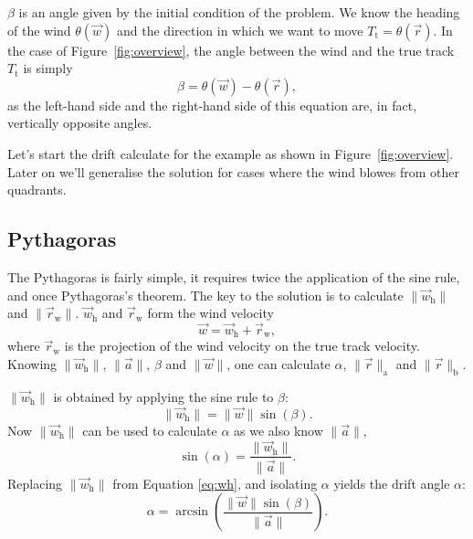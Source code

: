 \documentclass[a4paper,10pt]{article}
\begin{document}
$\beta$ is an angle given by the initial condition of the problem.
We know the heading of the wind $\theta(\vec{w})$ and the direction in which we want to move $T_\mathrm{t}=\theta(\vec{r})$.
In the case of Figure~\ref{fig:overview}, the angle between the wind and the true track $T_\mathrm{t}$ is simply
\begin{equation}
 \beta = \theta(\vec{w}) - \theta(\vec{r}),
\end{equation}
as the left-hand side and the right-hand side of this equation are, in fact, vertically opposite angles. 

Let's start the drift calculate for the example as shown in Figure~\ref{fig:overview}.
Later on we'll generalise the solution for cases where the wind blowes from other quadrants.

\subsection{Pythagoras}

The Pythagoras is fairly simple, it requires twice the application of the sine rule, and once Pythagoras's theorem.
The key to the solution is to calculate $\|\vec{w}_\mathrm{h}\|$ and $\|\vec{r}_\mathrm{w}\|$.
$\vec{w}_\mathrm{h}$ and $\vec{r}_\mathrm{w}$ form the wind velocity 
\begin{equation}
 \vec{w}= \vec{w}_\mathrm{h}+\vec{r}_\mathrm{w},
\end{equation}
where $\vec{r}_\mathrm{w}$ is the projection of the wind velocity on the true track velocity.
Knowing $\|\vec{w}_\mathrm{h}\|$, $\|\vec{a}\|$, $\beta$ and $\|\vec{w}\|$, one can calculate $\alpha$, $\|\vec{r}\|_\mathrm{a}$ and $\|\vec{r}\|_\mathrm{b}$.

$\|\vec{w}_\mathrm{h}\|$ is obtained by applying the sine rule to $\beta$:
\begin{equation}
 \|\vec{w}_\mathrm{h}\| = \|\vec{w}\| \sin(\beta).\label{eq:wh}
\end{equation}
Now $\|\vec{w}_\mathrm{h}\|$ can be used to calculate $\alpha$ as we also know $\|\vec{a}\|$,
\begin{equation}
 \sin (\alpha) = \frac{\|\vec{w}_\mathrm{h}\|}{\|\vec{a}\|}.
\end{equation}
Replacing $\|\vec{w}_\mathrm{h}\|$ from Equation \ref{eq:wh}, and isolating $\alpha$ yields the drift angle $\alpha$:
\begin{equation}
 \alpha = \arcsin\left(\frac{\|\vec{w}\| \sin(\beta)}{\|\vec{a}\|}\right).
\end{equation}
\end{document}
